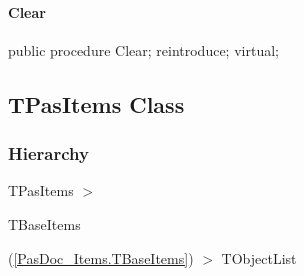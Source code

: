 \documentclass{report}
\newif\ifpdf
\begin{document}
\paragraph*{Clear}\hspace*{\fill}

\label{PasDoc_Items.TBaseItems-Clear}
\begin{list}{}{
\setlength{\itemindent}{0cm}
\setlength{\listparindent}{0cm}
\setlength{\leftmargin}{\evensidemargin}
\addtolength{\leftmargin}{\tmplength}
\settowidth{\labelsep}{X}
\addtolength{\leftmargin}{\labelsep}
\setlength{\labelwidth}{\tmplength}
}
\item[\textbf{Declaration}\hfill]
\ifpdf
\begin{flushleft}
\fi
\begin{ttfamily}
public procedure Clear; reintroduce; virtual;\end{ttfamily}

\ifpdf
\end{flushleft}
\fi

\end{list}
\ifpdf
\subsection*{\large{\textbf{TPasItems Class}}\normalsize\hspace{1ex}\hrulefill}
\else
\subsection*{TPasItems Class}
\fi
\label{PasDoc_Items.TPasItems}
\subsubsection*{\large{\textbf{Hierarchy}}\normalsize\hspace{1ex}\hfill}
TPasItems {$>$} \begin{ttfamily}TBaseItems\end{ttfamily}(\ref{PasDoc_Items.TBaseItems}) {$>$} 
TObjectList
\end{document}
